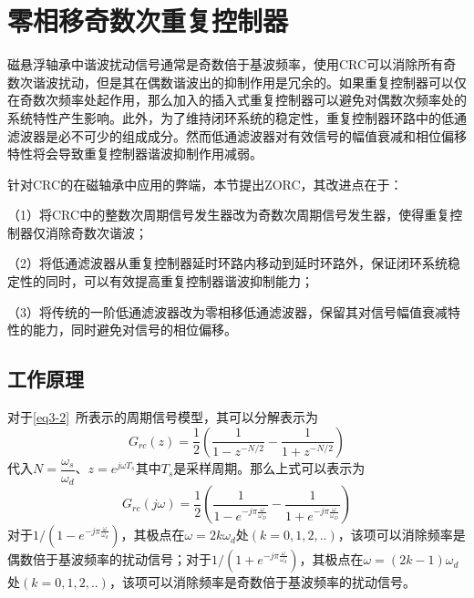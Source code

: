 \documentclass[
  lang=cn,
  degree=master,
  openany,oneside
]{nuaathesis}
\begin{document}
\section{零相移奇数次重复控制器}
磁悬浮轴承中谐波扰动信号通常是奇数倍于基波频率，使用CRC可以消除所有奇数次谐波扰动，但是其在偶数谐波出的抑制作用是冗余的。如果重复控制器可以仅在奇数次频率处起作用，那么加入的插入式重复控制器可以避免对偶数次频率处的系统特性产生影响。此外，为了维持闭环系统的稳定性，重复控制器环路中的低通滤波器是必不可少的组成成分。然而低通滤波器对有效信号的幅值衰减和相位偏移特性将会导致重复控制器谐波抑制作用减弱。

针对CRC的在磁轴承中应用的弊端，本节提出ZORC，其改进点在于：

（1）将CRC中的整数次周期信号发生器改为奇数次周期信号发生器，使得重复控制器仅消除奇数次谐波；

（2）将低通滤波器从重复控制器延时环路内移动到延时环路外，保证闭环系统稳定性的同时，可以有效提高重复控制器谐波抑制能力；

（3）将传统的一阶低通滤波器改为零相移低通滤波器，保留其对信号幅值衰减特性的能力，同时避免对信号的相位偏移。

\subsection{工作原理}
对于\autoref{eq3-2}~所表示的周期信号模型，其可以分解表示为
\begin{equation}
G_{rc}(z)=\dfrac{1}{2}\left(\dfrac{1}{1-z^{-N/2}}-\dfrac{1}{1+z^{-N/2}}\right)
\end{equation}
代入$N=\dfrac{\omega_s}{\omega_d}$、$z=e^{j\omega T_s}$其中$T_s$是采样周期。那么上式可以表示为
\begin{equation}
G_{rc}(j\omega)=\frac{1}{2}\left(\frac{1}{1-e^{-j\pi\frac{\omega}{\omega_D}}}-\frac{1}{1+e^{-j\pi\frac{\omega}{\omega_D}}}\right)
\end{equation}
对于${1}/\left(1-e^{-j\pi\frac{\omega}{\omega_d}}\right)$，其极点在$\omega=2k\omega_d$处$(k=0,1,2,..)$，该项可以消除频率是偶数倍于基波频率的扰动信号；对于${1}/\left(1+e^{-j\pi\frac{\omega}{\omega_d}}\right)$，其极点在$\omega=(2k-1)\omega_d$处$(k=0,1,2,..)$，该项可以消除频率是奇数倍于基波频率的扰动信号。
\end{document}
